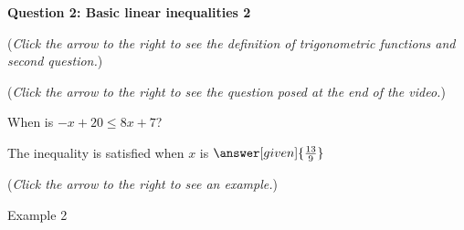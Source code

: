 \documentclass{ximera}
\begin{document}
\textbf{Question 2: Basic linear inequalities 2}
\begin{question}
\begin{flushright}
{\color{blue}(\emph{Click the arrow to the right to see the definition
of trigonometric functions and second question.})}
\end{flushright}
\begin{center}
\begin{expandable}
\begin{flushright}
{\color{blue}(\emph{Click the arrow to the right to see the question
posed at the end of the video.})}
\end{flushright}
\begin{expandable}
When is $-x+20\leq 8x+7$?\\
\begin{prompt}
The inequality is satisfied when $x$ is  $\answer[given]{\frac{13}{9}}$
\end{prompt}
\begin{flushright}
{\color{blue}(\emph{Click the arrow to the right to see an example.})}
\end{flushright}
\begin{expandable}
\begin{center}
Example 2
\end{center}
\end{expandable}
\end{expandable}
\end{expandable}
\end{center}
\end{question}
\end{document}
